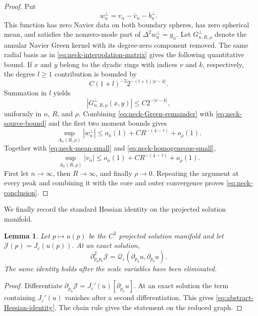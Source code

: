 \documentclass[11pt]{article}
\newtheorem{lemma}[theorem]{Lemma}
\numberwithin{equation}{section}
\begin{document}
\begin{proof}
Put
\[
w_n^\perp
=v_n-\overline v_n-b_n^\perp.
\]
This function has zero Navier data on both boundary spheres, has zero
spherical mean, and satisfies the nonzero-mode part of
$\Delta^2w_n^\perp=g_n$.  Let $G_{n,R,\rho}^\perp$ denote the
annular Navier Green kernel with its degree-zero component removed.
The same radial basis as in
\eqref{eq:neck-interpolation-matrix} gives the following quantitative
bound.  If $x$ and $y$ belong to the dyadic rings with indices
$\nu$ and $k$, respectively, the degree $l\geq1$ contribution is
bounded by
\[
C(1+l)^{-2}2^{-(l+1)|\nu-k|}.
\]
Summation in $l$ yields
\begin{equation}\label{eq:neck-Green-remainder}
|G_{n,R,\rho}^\perp(x,y)|
\leq C2^{-|\nu-k|},
\end{equation}
uniformly in $n$, $R$, and $\rho$.  Combining
\eqref{eq:neck-Green-remainder} with
\eqref{eq:neck-source-bound} and the first two moment bounds gives
\[
\sup_{A_n(R,\rho)}|w_n^\perp|
\leq o_n(1)+CR^{-(4-\tau)}+o_\rho(1).
\]
Together with \eqref{eq:neck-mean-small} and
\eqref{eq:neck-homogeneous-small},
\[
\sup_{A_n(R,\rho)}|v_n|
\leq o_n(1)+CR^{-(4-\tau)}+o_\rho(1).
\]
First let $n\to\infty$, then $R\to\infty$, and finally
$\rho\to0$.  Repeating the argument at every peak and combining it
with the core and outer convergence proves
\eqref{eq:neck-conclusion}.
\end{proof}

We finally record the standard Hessian identity on the projected solution manifold.

\begin{lemma}\label{lem:Hessian-identity}
Let $p\mapsto u(p)$ be the $C^2$ projected solution manifold and let
$\mathcal J(p)=J_\varepsilon(u(p))$. At an exact solution,
\begin{equation}\label{eq:abstract-Hessian-identity}
\partial_{p_ap_b}^2\mathcal J
=\mathcal Q_\varepsilon(\partial_{p_a}u,\partial_{p_b}u).
\end{equation}
The same identity holds after the scale variables have been eliminated.
\end{lemma}

\begin{proof}
Differentiate
$\partial_{p_a}\mathcal J=J_\varepsilon'(u)[\partial_{p_a}u]$. At an exact solution the term containing
$J_\varepsilon'(u)$ vanishes after a second differentiation. This gives
\eqref{eq:abstract-Hessian-identity}. The chain rule gives the statement on the reduced graph.
\end{proof}
\end{document}
